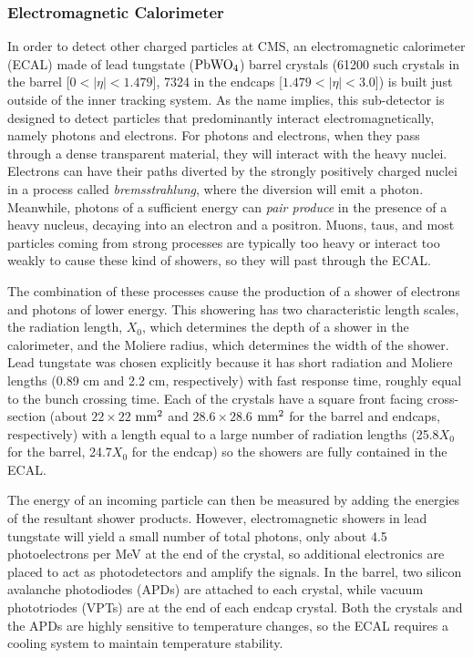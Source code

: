 \subsubsection{Electromagnetic Calorimeter}
\label{sec:ElecCalo}

In order to detect other charged particles at CMS, an electromagnetic calorimeter (ECAL) made of lead tungstate ($\rm{PbWO}_4$) barrel crystals (61200 such crystals in the barrel [$0<|\eta|<1.479$], 7324 in the endcaps [$1.479<|\eta|<3.0$]) is built just outside of the inner tracking system. As the name implies, this sub-detector is designed to detect particles that predominantly interact electromagnetically, namely photons and electrons. For photons and electrons, when they pass through a dense transparent material, they will interact with the heavy nuclei. Electrons can have their paths diverted by the strongly positively charged nuclei in a process called \textit{bremsstrahlung}, where the diversion will emit a photon. Meanwhile, photons of a sufficient energy can \textit{pair produce} in the presence of a heavy nucleus, decaying into an electron and a positron. Muons, taus, and most particles coming from strong processes are typically too heavy or interact too weakly to cause these kind of showers, so they will past through the ECAL.

The combination of these processes cause the production of a shower of electrons and photons of lower energy. This showering has two characteristic length scales, the radiation length, $X_0$, which determines the depth of a shower in the calorimeter, and the Moliere radius, which determines the width of the shower. Lead tungstate was chosen explicitly because it has short radiation and Moliere lengths (0.89 cm and 2.2 cm, respectively) with fast response time, roughly equal to the bunch crossing time. Each of the crystals have a square front facing cross-section (about $22\times22$ $\rm{mm}^2$ and $28.6\times28.6$ $\rm{mm}^2$ for the barrel and endcaps, respectively) with a length equal to a large number of radiation lengths (25.8$X_0$ for the barrel, 24.7$X_0$ for the endcap) so the showers are fully contained in the ECAL. 

The energy of an incoming particle can then be measured by adding the energies of the resultant shower products. However, electromagnetic showers in lead tungstate will yield a small number of total photons, only about 4.5 photoelectrons per MeV at the end of the crystal, so additional electronics are placed to act as photodetectors and amplify the signals. In the barrel, two silicon avalanche photodiodes (APDs) are attached to each crystal, while vacuum phototriodes (VPTs) are at the end of each endcap crystal. Both the crystals and the APDs are highly sensitive to temperature changes, so the ECAL requires a cooling system to maintain temperature stability. 

